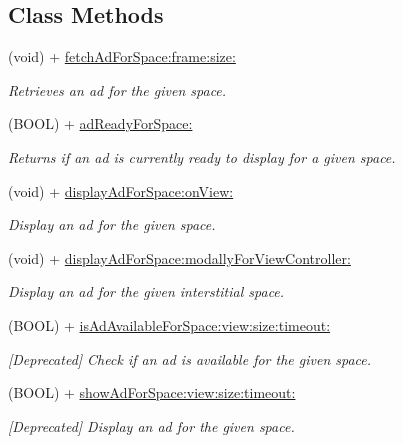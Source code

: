\subsection*{Class Methods}
\begin{DoxyCompactItemize}
\item 
(void) + \hyperlink{interfaceFlurryAds_a7eb674e15673f908467be52017169368}{fetch\+Ad\+For\+Space\+:frame\+:size\+:}
\begin{DoxyCompactList}\small\item\em Retrieves an ad for the given {\ttfamily space}. \end{DoxyCompactList}\item 
(B\+O\+OL) + \hyperlink{interfaceFlurryAds_a1f87cd568f71e77a9c89264b165d2164}{ad\+Ready\+For\+Space\+:}
\begin{DoxyCompactList}\small\item\em Returns if an ad is currently ready to display for a given {\ttfamily space}. \end{DoxyCompactList}\item 
(void) + \hyperlink{interfaceFlurryAds_a3a0f6e50b29081bbe13a9856cc5e4844}{display\+Ad\+For\+Space\+:on\+View\+:}
\begin{DoxyCompactList}\small\item\em Display an ad for the given {\ttfamily space}. \end{DoxyCompactList}\item 
(void) + \hyperlink{interfaceFlurryAds_a0ae5e7f43964b0a0245bc21ef08cfdfa}{display\+Ad\+For\+Space\+:modally\+For\+View\+Controller\+:}
\begin{DoxyCompactList}\small\item\em Display an ad for the given interstitial {\ttfamily space}. \end{DoxyCompactList}\item 
(B\+O\+OL) + \hyperlink{interfaceFlurryAds_abf047d7df31c163b9b5d4c706827419f}{is\+Ad\+Available\+For\+Space\+:view\+:size\+:timeout\+:}
\begin{DoxyCompactList}\small\item\em \mbox{[}Deprecated\mbox{]} Check if an ad is available for the given {\ttfamily space}. \end{DoxyCompactList}\item 
(B\+O\+OL) + \hyperlink{interfaceFlurryAds_a8d460375f558369833a1f43e568ed137}{show\+Ad\+For\+Space\+:view\+:size\+:timeout\+:}
\begin{DoxyCompactList}\small\item\em \mbox{[}Deprecated\mbox{]} Display an ad for the given {\ttfamily space}. \end{DoxyCompactList}\item 

\end{DoxyCompactItemize}
